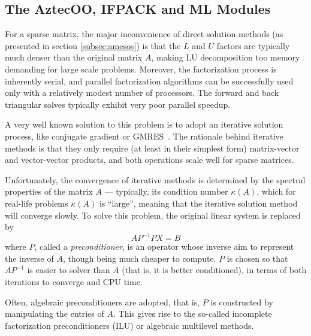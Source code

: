 \documentclass[10pt,relax]{SANDreport}
\begin{document}
\subsection{The AztecOO, IFPACK and ML Modules}
\label{subsec:aztecoo_ifpack}

For a sparse matrix, the major inconvenience of direct solution
methods (as presented in section \ref{subsec:amesos})
  is that the $L$ and $U$ factors are typically much denser than
the original matrix $A$, making LU decomposition too memory
demanding for large scale problems. Moreover, the factorization
process is inherently serial, and parallel factorization algorithms
can be successfully used only with a relatively modest number of
processors. The forward and back triangular solves typically exhibit
very poor parallel speedup.

A very well known solution to this problem is to adopt an iterative
solution process, like conjugate gradient or GMRES~\cite{golub96matrix}. The
rationale behind iterative methods is that they only require (at least
in their simplest form) matrix-vector and vector-vector products, and
both operations scale well for sparse matrices.

Unfortunately, the convergence of iterative methods is determined by
the spectral properties of the matrix $A$ --- typically, its condition
number $\kappa(A)$, which for real-life problems $\kappa(A)$ is
``large'', meaning that the iterative solution method will converge
slowly. To solve this problem, the original linear system is replaced
by
\[
A P^{-1} P X = B
\]
where $P$, called a {\sl preconditioner}, is an operator whose inverse
aim to represent the inverse of $A$, though being much cheaper to
compute.  $P$ is chosen so that $AP^{-1}$ is easier to solver than $A$
(that is, it is better conditioned), in terms of both iterations to converge
and CPU time.

\smallskip

Often, algebraic preconditioners are adopted, that is, $P$ is
constructed by manipulating the entries of $A$. This gives rise to the
so-called incomplete factorization preconditioners (ILU) or algebraic
multilevel methods.
\end{document}
